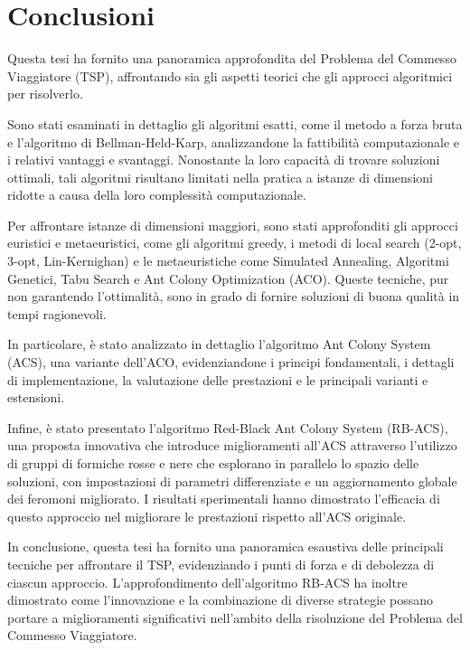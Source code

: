 
%

\chapter{Conclusioni}
\label{chapt:7}

Questa tesi ha fornito una panoramica approfondita del Problema del Commesso Viaggiatore (TSP), affrontando sia gli aspetti teorici che gli approcci algoritmici per risolverlo.

Sono stati esaminati in dettaglio gli algoritmi esatti, come il metodo a forza bruta e l'algoritmo di Bellman-Held-Karp, analizzandone la fattibilità computazionale e i relativi vantaggi e svantaggi. Nonostante la loro capacità di trovare soluzioni ottimali, tali algoritmi risultano limitati nella pratica a istanze di dimensioni ridotte a causa della loro complessità computazionale.

Per affrontare istanze di dimensioni maggiori, sono stati approfonditi gli approcci euristici e metaeuristici, come gli algoritmi greedy, i metodi di local search (2-opt, 3-opt, Lin-Kernighan) e le metaeuristiche come Simulated Annealing, Algoritmi Genetici, Tabu Search e Ant Colony Optimization (ACO). Queste tecniche, pur non garantendo l'ottimalità, sono in grado di fornire soluzioni di buona qualità in tempi ragionevoli.

In particolare, è stato analizzato in dettaglio l'algoritmo Ant Colony System (ACS), una variante dell'ACO, evidenziandone i principi fondamentali, i dettagli di implementazione, la valutazione delle prestazioni e le principali varianti e estensioni.

Infine, è stato presentato l'algoritmo Red-Black Ant Colony System (RB-ACS), una proposta innovativa che introduce miglioramenti all'ACS attraverso l'utilizzo di gruppi di formiche rosse e nere che esplorano in parallelo lo spazio delle soluzioni, con impostazioni di parametri differenziate e un aggiornamento globale dei feromoni migliorato. I risultati sperimentali hanno dimostrato l'efficacia di questo approccio nel migliorare le prestazioni rispetto all'ACS originale.

In conclusione, questa tesi ha fornito una panoramica esaustiva delle principali tecniche per affrontare il TSP, evidenziando i punti di forza e di debolezza di ciascun approccio. L'approfondimento dell'algoritmo RB-ACS ha inoltre dimostrato come l'innovazione e la combinazione di diverse strategie possano portare a miglioramenti significativi nell'ambito della risoluzione del Problema del Commesso Viaggiatore.
